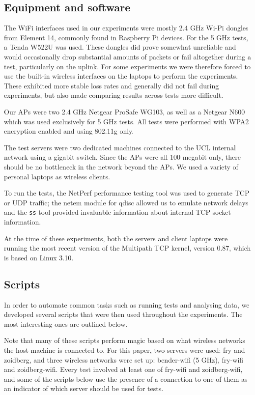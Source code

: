 \subsection{Equipment and software}
\label{sec:met:equip}
The WiFi interfaces used in our experiments were mostly 2.4 GHz Wi-Pi dongles
from Element 14, commonly found in Raspberry Pi devices. For the 5 GHz tests, a
Tenda W522U was used. These dongles did prove somewhat unreliable and would
occasionally drop substantial amounts of packets or fail altogether during a
test, particularly on the uplink. For some experiments we were therefore forced
to use the built-in wireless interfaces on the laptops to perform the
experiments.  These exhibited more stable loss rates and generally did not fail
during experiments, but also made comparing results across tests more difficult.

Our APs were two 2.4 GHz Netgear ProSafe WG103, as well as a Netgear N600 which
was used exclusively for 5 GHz tests. All tests were performed with WPA2
encryption enabled and using 802.11g only.

The test servers were two dedicated machines connected to the UCL internal
network using a gigabit switch. Since the APs were all 100 megabit only, there
should be no bottleneck in the network beyond the APs. We used a variety of
personal laptops as wireless clients.

To run the tests, the NetPerf performance testing tool was used to generate TCP
or UDP traffic; the netem module for qdisc allowed us to emulate network delays
and the \texttt{ss} tool provided invaluable information about internal TCP
socket information.

At the time of these experiments, both the servers and client laptops were
running the most recent version of the Multipath TCP kernel, version 0.87, which
is based on Linux 3.10.

\subsection{Scripts}
\label{sec:met:scripts}
In order to automate common tasks such as running tests and analysing data, we
developed several scripts that were then used throughout the experiments. The
most interesting ones are outlined below.

Note that many of these scripts perform magic based on what wireless networks
the host machine is connected to. For this paper, two servers were used: fry and
zoidberg, and three wireless networks were set up: bender-wifi (5 GHz), fry-wifi
and zoidberg-wifi. Every test involved at least one of fry-wifi and
zoidberg-wifi, and some of the scripts below use the presence of a connection to
one of them as an indicator of which server should be used for tests.

